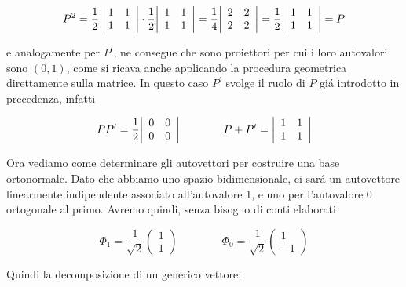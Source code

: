 \begin{itemize}
	$$P^{2}={\frac{1}{2}}{\left|\begin{array}{l l}{1}&{1}\\ {1}&{1}\end{array}\right|}\cdot{\frac{1}{2}}{\left|\begin{array}{l l}{1}&{1}\\ {1}&{1}\end{array}\right|}={\frac{1}{4}}{\left|\begin{array}{l l}{2}&{2}\\ {2}&{2}\end{array}\right|}={\frac{1}{2}}{\left|\begin{array}{l l}{1}&{1}\\ {1}&{1}\end{array}\right|}=P$$

	e analogamente per $P^\prime$, ne consegue che sono proiettori per cui i loro autovalori sono $(0, 1)$, come si ricava anche applicando la procedura geometrica direttamente sulla matrice. In questo caso $P^\prime$ svolge il ruolo di $P$ gi\'a introdotto in precedenza, infatti

	$$P P^{\prime}={\frac{1}{2}}{\left|\begin{array}{l l}{0}&{0}\\ {0}&{0}\end{array}\right|}\qquad\qquad P+P^{\prime}={\left|\begin{array}{l l}{1}&{1}\\ {1}&{1}\end{array}\right|}$$

	Ora vediamo come determinare gli autovettori per costruire una base ortonormale. Dato che abbiamo uno spazio bidimensionale, ci sar\'a un autovettore linearmente indipendente associato all'autovalore 1, e uno per l'autovalore 0 ortogonale al primo. Avremo quindi, senza bisogno di conti elaborati

	$$\Phi_{1}={\frac{1}{\sqrt{2}}}\left(\begin{array}{c}{{1}}\\ {{1}}\end{array}\right) \qquad\qquad	\Phi_{0}=\frac{1}{\sqrt{2}}\left(\begin{array}{c}{{1}}\\ {{-1}}\end{array}\right)$$

	Quindi la decomposizione di un generico vettore:
	

\end{itemize}
